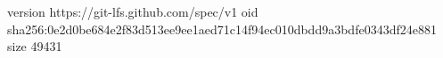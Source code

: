 version https://git-lfs.github.com/spec/v1
oid sha256:0e2d0be684e2f83d513ee9ee1aed71c14f94ec010dbdd9a3bdfe0343df24e881
size 49431
